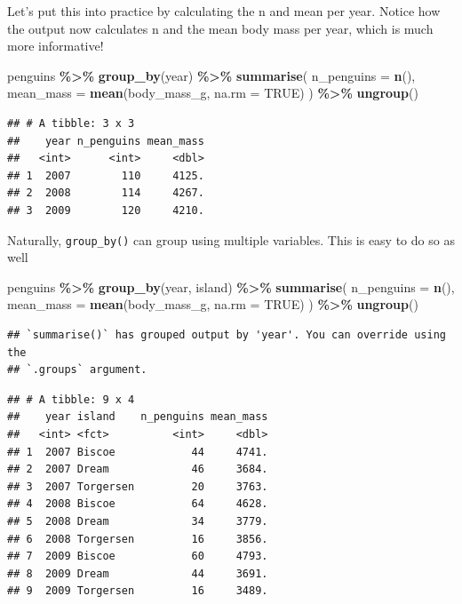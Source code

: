 \documentclass[
]{book}
\newenvironment{Shaded}{\begin{snugshade}}{\end{snugshade}}
\newcommand{\AttributeTok}[1]{\textcolor[rgb]{0.13,0.29,0.53}{#1}}
\newcommand{\ConstantTok}[1]{\textcolor[rgb]{0.56,0.35,0.01}{#1}}
\newcommand{\FunctionTok}[1]{\textcolor[rgb]{0.13,0.29,0.53}{\textbf{#1}}}
\newcommand{\NormalTok}[1]{#1}
\newcommand{\SpecialCharTok}[1]{\textcolor[rgb]{0.81,0.36,0.00}{\textbf{#1}}}
\begin{document}
Let's put this into practice by calculating the n and mean per year. Notice how the output now calculates n and the mean body mass per year, which is much more informative!

\begin{Shaded}
\begin{Highlighting}[]
\NormalTok{penguins }\SpecialCharTok{\%\textgreater{}\%}
  \FunctionTok{group\_by}\NormalTok{(year) }\SpecialCharTok{\%\textgreater{}\%}
  \FunctionTok{summarise}\NormalTok{(}
    \AttributeTok{n\_penguins =} \FunctionTok{n}\NormalTok{(),}
    \AttributeTok{mean\_mass =} \FunctionTok{mean}\NormalTok{(body\_mass\_g, }\AttributeTok{na.rm =} \ConstantTok{TRUE}\NormalTok{)}
\NormalTok{  ) }\SpecialCharTok{\%\textgreater{}\%}
  \FunctionTok{ungroup}\NormalTok{()}
\end{Highlighting}
\end{Shaded}

\begin{verbatim}
## # A tibble: 3 x 3
##    year n_penguins mean_mass
##   <int>      <int>     <dbl>
## 1  2007        110     4125.
## 2  2008        114     4267.
## 3  2009        120     4210.
\end{verbatim}

Naturally, \texttt{group\_by()} can group using multiple variables. This is easy to do so as well

\begin{Shaded}
\begin{Highlighting}[]
\NormalTok{penguins }\SpecialCharTok{\%\textgreater{}\%}
  \FunctionTok{group\_by}\NormalTok{(year, island) }\SpecialCharTok{\%\textgreater{}\%}
  \FunctionTok{summarise}\NormalTok{(}
    \AttributeTok{n\_penguins =} \FunctionTok{n}\NormalTok{(),}
    \AttributeTok{mean\_mass =} \FunctionTok{mean}\NormalTok{(body\_mass\_g, }\AttributeTok{na.rm =} \ConstantTok{TRUE}\NormalTok{)}
\NormalTok{  ) }\SpecialCharTok{\%\textgreater{}\%}
  \FunctionTok{ungroup}\NormalTok{()}
\end{Highlighting}
\end{Shaded}

\begin{verbatim}
## `summarise()` has grouped output by 'year'. You can override using the
## `.groups` argument.
\end{verbatim}

\begin{verbatim}
## # A tibble: 9 x 4
##    year island    n_penguins mean_mass
##   <int> <fct>          <int>     <dbl>
## 1  2007 Biscoe            44     4741.
## 2  2007 Dream             46     3684.
## 3  2007 Torgersen         20     3763.
## 4  2008 Biscoe            64     4628.
## 5  2008 Dream             34     3779.
## 6  2008 Torgersen         16     3856.
## 7  2009 Biscoe            60     4793.
## 8  2009 Dream             44     3691.
## 9  2009 Torgersen         16     3489.
\end{verbatim}
\end{document}
